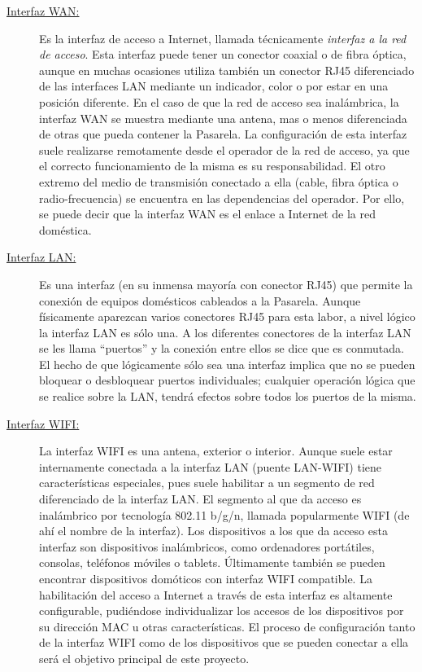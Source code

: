 \documentclass[12pt]{article}
\begin{document}
    \begin{description}
        \item[\underline{Interfaz WAN:}] Es la interfaz de acceso a Internet, llamada técnicamente \textit{interfaz a la red de acceso}. Esta interfaz puede tener un conector coaxial o de fibra óptica, aunque en muchas ocasiones utiliza también un conector RJ45 diferenciado de las interfaces LAN mediante un indicador, color o por estar en una posición diferente. En el caso de que la red de acceso sea inalámbrica, la interfaz WAN se muestra mediante una antena, mas o menos diferenciada de otras que pueda contener la Pasarela. La configuración de esta interfaz suele realizarse remotamente desde el operador de la red de acceso, ya que el correcto funcionamiento de la misma es su responsabilidad. El otro extremo del medio de transmisión conectado a ella (cable, fibra óptica o radio-frecuencia) se encuentra en las dependencias del operador. Por ello, se puede decir que la interfaz WAN es el enlace a Internet de la red doméstica.
        \item[\underline{Interfaz LAN:}] Es una interfaz (en su inmensa mayoría con conector RJ45) que permite la conexión de equipos domésticos cableados a la Pasarela. Aunque físicamente aparezcan varios conectores RJ45 para esta labor, a nivel lógico la interfaz LAN es sólo una. A los diferentes conectores de la interfaz LAN se les llama ``puertos'' y la conexión entre ellos se dice que es conmutada. El hecho de que lógicamente sólo sea una interfaz implica que no se pueden bloquear o desbloquear puertos individuales; cualquier operación lógica que se realice sobre la LAN, tendrá efectos sobre todos los puertos de la misma.
        \item[\underline{Interfaz WIFI:}] La interfaz WIFI es una antena, exterior o interior. Aunque suele estar internamente conectada a la interfaz LAN (puente LAN-WIFI) tiene características especiales, pues suele habilitar a un segmento de red diferenciado de la interfaz LAN. El segmento al que da acceso es inalámbrico por tecnología 802.11 b/g/n, llamada popularmente WIFI (de ahí el nombre de la interfaz). Los dispositivos a los que da acceso esta interfaz son dispositivos inalámbricos, como ordenadores portátiles, consolas, teléfonos móviles o tablets. Últimamente también se pueden encontrar dispositivos domóticos con interfaz WIFI compatible. La habilitación del acceso a Internet a través de esta interfaz es altamente configurable, pudiéndose individualizar los accesos de los dispositivos por su dirección MAC u otras características. El proceso de configuración tanto de la interfaz WIFI como de los dispositivos que se pueden conectar a ella será el objetivo principal de este proyecto.
    \end{description}
\end{document}
